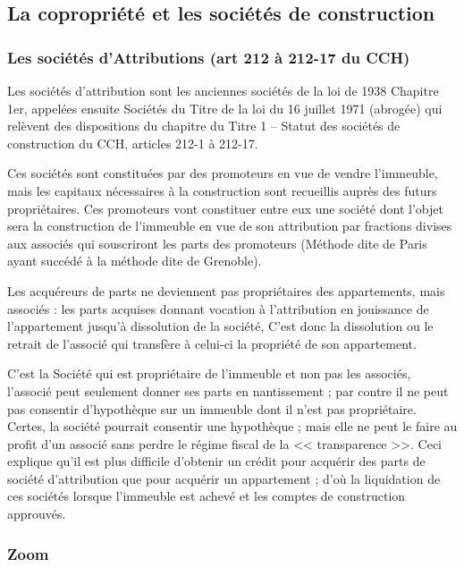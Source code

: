	\subsection{La copropriété et les sociétés de construction}
	
		\subsubsection{Les sociétés d’Attributions (art 212 à 212-17 du CCH)}
			
			Les sociétés d'attribution sont les anciennes sociétés de la loi de 1938 Chapitre 1er, appelées ensuite
			Sociétés du Titre \II{} de la loi du 16 juillet 1971 (abrogée) qui relèvent des dispositions du chapitre \II{} du Titre
			1\ier{} – Statut des sociétés de construction du CCH, articles 212-1 à 212-17.
			
			Ces sociétés sont constituées par des promoteurs en vue de vendre l'immeuble, mais les capitaux
			nécessaires à la construction sont recueillis auprès des futurs propriétaires. Ces promoteurs vont
			constituer entre eux une société dont l'objet sera la construction de l'immeuble en vue de son attribution
			par fractions divises aux associés qui souscriront les parts des promoteurs (Méthode dite de Paris ayant
			succédé à la méthode dite de Grenoble).
			
			Les acquéreurs de parts ne deviennent pas propriétaires des appartements, mais associés : les parts
			acquises donnant vocation à l'attribution en jouissance de l'appartement jusqu'à dissolution de la société,
			C'est donc la dissolution ou le retrait de l'associé qui transfère à celui-ci la propriété de son appartement.
			
			C'est la Société qui est propriétaire de l'immeuble et non pas les associés, l'associé peut seulement donner ses parts en nantissement ; par contre il ne peut pas consentir d’hypothèque sur un immeuble dont il n’est pas propriétaire. Certes, la société pourrait consentir une hypothèque ; mais elle ne peut le faire au profit d’un associé sans perdre le régime fiscal de la << transparence >>. Ceci explique qu’il est plus difficile d’obtenir un crédit pour acquérir des parts de société d’attribution que pour acquérir un appartement ; d’où la liquidation de ces sociétés lorsque l’immeuble est achevé et les comptes de construction approuvés.
	
			\subsubsection*{Zoom}
			
